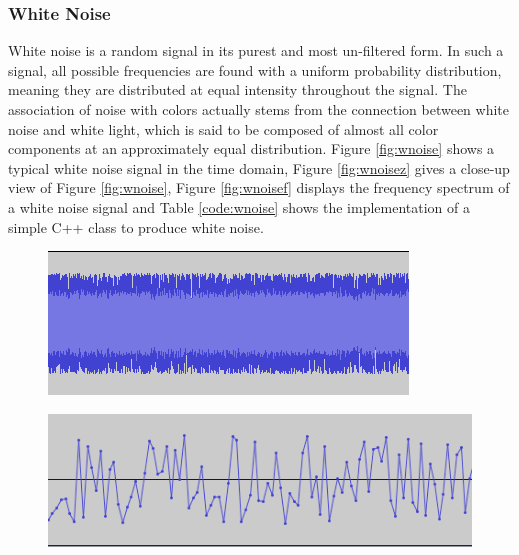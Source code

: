 
  \subsubsection{White Noise}

  White noise is a random signal in its purest and most un-filtered form. In such a signal, all possible frequencies are found with a uniform probability distribution, meaning they are distributed at equal intensity throughout the signal. The association of noise with colors actually stems from the connection between white noise and white light, which is said to be composed of almost all color components at an approximately equal distribution. Figure \ref{fig:wnoise} shows a typical white noise signal in the time domain, Figure \ref{fig:wnoisez} gives a close-up view of Figure \ref{fig:wnoise}, Figure \ref{fig:wnoisef} displays the frequency spectrum of a white noise signal and Table \ref{code:wnoise} shows the implementation of a simple C++ class to produce white noise.

  \begin{figure}[h!]
    {\includegraphics[scale=0.62]{img/wnoise}}
  \end{figure}

  \begin{figure}[h!]
    {\includegraphics[scale=0.5]{img/wnoisez}}
  \end{figure}

